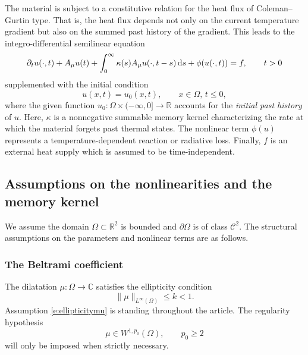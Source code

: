 \documentclass[12pt,leqno]{amsart}
\def\d{{\rm d}}
\theoremstyle{definition}
\numberwithin{equation}{section}
\numberwithin{figure}{section}
\begin{document}
The material is subject to a constitutive relation for the heat flux of  Coleman--Gurtin type. That is, the heat flux depends not only on the current temperature gradient but also on the summed past history of the gradient. This leads to the  integro-differential semilinear  equation \begin{equation}\label{eq:intro-model}
    \partial_t u(\cdot, t) + A_\mu u(t) + \int_0^\infty \kappa(s) A_\mu u(\cdot, t-s)  \,\d s + \phi(u(\cdot, t)) = f, \qquad t>0
\end{equation}
supplemented with the initial condition
\begin{equation}
	\label{e:intro-initial}
	u(x,t) = u_0(x,t), \qquad x\in \Omega,\, t\leq 0,
\end{equation}
where the given function $u_0:\Omega \times (-\infty, 0]\to \mathbb R$ accounts for the \emph{initial past history} of $u$.
Here, $\kappa$ is a nonnegative summable memory kernel characterizing the rate at which the material forgets past thermal states. The nonlinear term $\phi(u)$ represents a temperature-dependent reaction or radiative loss.
Finally,  $f$ is an  external heat supply which is assumed to be time-independent.


\subsection{Assumptions on the nonlinearities and the memory kernel}
 We assume the domain $\Omega \subset \mathbb{R}^2$ is bounded and $\partial \Omega$ is of class  $\mathcal{C}^2$. The structural assumptions on the parameters and nonlinear terms are as follows.

\subsubsection*{The Beltrami coefficient}
The dilatation $\mu:\Omega \to \mathbb C$ satisfies the ellipticity condition \begin{equation} \label{e:ellipticitymu}
	\|\mu\|_{L^\infty(\Omega)} \le k < 1.
\end{equation}Assumption \eqref{e:ellipticitymu} is standing throughout the article. The regularity hypothesis
 \begin{equation} \label{e:regmu}
\mu \in W^{1,p_0}(\Omega), \qquad p_0\geq 2
\end{equation}
will  only be imposed when strictly necessary.
 
\end{document}
